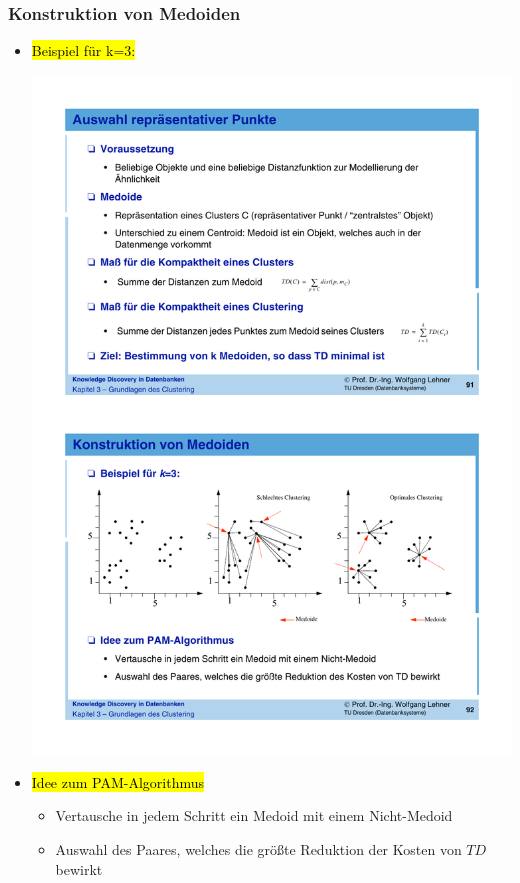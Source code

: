\begin{frame}
\frametitle{Konstruktion von Medoiden}

\begin{itemize}
\item\hl{Beispiel für k=3:}

\begin{center}
\includegraphics[scale=.6]{fig7/medoide.pdf}
\end{center}

\item\hl{Idee zum PAM-Algorithmus}
\begin{itemize}
\item Vertausche in jedem Schritt ein Medoid mit einem Nicht-Medoid
\item Auswahl des Paares, welches die größte Reduktion der Kosten von
  $TD$ bewirkt
\end{itemize}
\end{itemize}

\end{frame}

